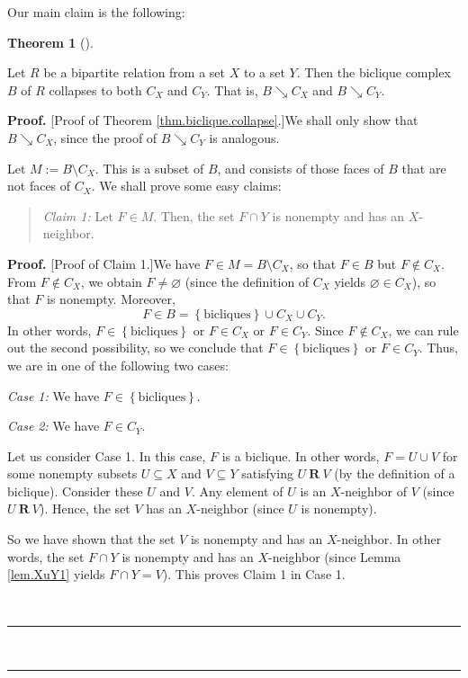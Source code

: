 \documentclass[numbers=enddot,12pt,final,onecolumn,notitlepage]{scrartcl}%
\theoremstyle{definition}
\newtheorem{theo}{Theorem}[section]
\newenvironment{theorem}[1][]
{\begin{theo}[#1]\begin{leftbar}}
{\end{leftbar}\end{theo}}
\newenvironment{statement}{\begin{quote}}{\end{quote}}
\newenvironment{proof}[1][Proof]{\noindent\textbf{#1.} }{\ \rule{0.5em}{0.5em}}
\newenvironment{vershort}{}{}
\begin{document}
Our main claim is the following:

\begin{theorem}
\label{thm.biclique.collapse}
  Let $R$ be a bipartite relation from a set $X$ to a set $Y$.
  Then the biclique complex $B$ of $R$ collapses to both $C_{X}$ and $C_{Y}$.
  That is, $B\searrow C_{X}$ and $B\searrow C_{Y}$.
\end{theorem}

\begin{proof}
[Proof of Theorem \ref{thm.biclique.collapse}.]We shall only show that
$B\searrow C_{X}$, since the proof of $B\searrow C_{Y}$ is analogous.

Let $M:=B\setminus C_{X}$. This is a subset of $B$, and consists of those
faces of $B$ that are not faces of $C_{X}$. We shall prove some easy claims:

\begin{statement}
\textit{Claim 1:} Let $F\in M$. Then, the set $F\cap Y$ is nonempty and has an
$X$-neighbor.
\end{statement}

\begin{proof}
[Proof of Claim 1.]We have $F\in M=B\setminus C_{X}$, so that $F\in B$ but
$F\notin C_{X}$. From $F\notin C_{X}$, we obtain $F\neq\varnothing$ (since the
definition of $C_{X}$ yields $\varnothing\in C_{X}$), so that $F$ is nonempty.
Moreover,
\[
F\in B=\left\{  \text{bicliques}\right\}  \cup C_{X}\cup C_{Y}.
\]
In other words, $F\in\left\{  \text{bicliques}\right\}  $ or $F\in C_{X}$ or
$F\in C_{Y}$. Since $F\notin C_{X}$, we can rule out the second possibility,
so we conclude that $F\in\left\{  \text{bicliques}\right\}  $ or $F\in C_{Y}$.
Thus, we are in one of the following two cases:

\textit{Case 1:} We have $F\in\left\{  \text{bicliques}\right\}  $.

\textit{Case 2:} We have $F\in C_{Y}$.

\begin{vershort}
Let us consider Case 1. In this case, $F$ is a biclique. In other words,
$F=U\cup V$ for some nonempty subsets $U\subseteq X$ and $V\subseteq Y$
satisfying $U\ \mathbf{R}\ V$ (by the definition of a biclique). Consider
these $U$ and $V$. Any element of $U$ is an $X$-neighbor of $V$ (since
$U\ \mathbf{R}\ V$). Hence, the set $V$ has an $X$-neighbor (since $U$ is nonempty).

So we have shown that the set $V$ is nonempty and has an $X$-neighbor. In
other words, the set $F\cap Y$ is nonempty and has an $X$-neighbor (since
Lemma \ref{lem.XuY1} yields $F\cap Y=V$). This proves Claim 1 in Case 1.
\end{vershort}


\end{proof}
\end{proof}
\end{document}
